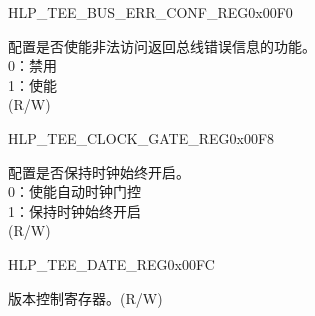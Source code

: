 \begin{register}{H}{LP\_TEE\_BUS\_ERR\_CONF\_REG}{0x00F0}\label{regdesc:LPTEEBUSERRCONFREG}
%
%
\regnewline%
\begin{regdesc}\begin{reglist}
\label{fielddesc:LPTEEBUSERRRESPEN}\item [LP\_TEE\_BUS\_ERR\_RESP\_EN] 配置是否使能非法访问返回总线错误信息的功能。\\
0：禁用\\
1：使能\\
(R/W)
\end{reglist}\end{regdesc}
\end{register}


\begin{register}{H}{LP\_TEE\_CLOCK\_GATE\_REG}{0x00F8}\label{regdesc:LPTEECLOCKGATEREG}
%
%
\regnewline%
\begin{regdesc}\begin{reglist}
\label{fielddesc:LPTEECLKEN}\item [LP\_TEE\_CLK\_EN] 配置是否保持时钟始终开启。\\
0：使能自动时钟门控 \\
1：保持时钟始终开启 \\ 
(R/W)
\end{reglist}\end{regdesc}
\end{register}


\begin{register}{H}{LP\_TEE\_DATE\_REG}{0x00FC}\label{regdesc:LPTEEDATEREG}
%
%
\regnewline%
\begin{regdesc}\begin{reglist}
\label{fielddesc:LPTEEDATE}\item [LP\_TEE\_DATE] 版本控制寄存器。(R/W)
\end{reglist}\end{regdesc}
\end{register}



